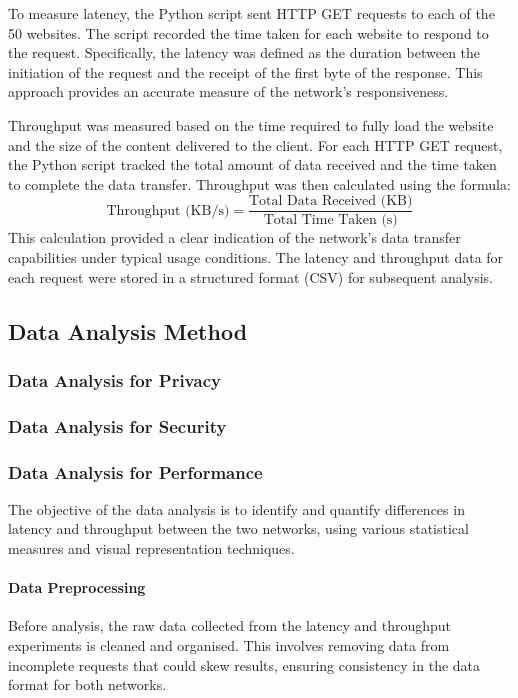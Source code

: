 \documentclass[12pt,conference]{IEEEtran}
\begin{document}
To measure latency, the Python script sent HTTP GET requests to each of the 50 websites. The script recorded the time taken for each website to respond to the request. Specifically, the latency was defined as the duration between the initiation of the request and the receipt of the first byte of the response. This approach provides an accurate measure of the network's responsiveness.

Throughput was measured based on the time required to fully load the website and the size of the content delivered to the client. For each HTTP GET request, the Python script tracked the total amount of data received and the time taken to complete the data transfer. Throughput was then calculated using the formula:
\[
\text{Throughput (KB/s)} = \frac{\text{Total Data Received (KB)}}{\text{Total Time Taken (s)}}
\]
This calculation provided a clear indication of the network's data transfer capabilities under typical usage conditions. The latency and throughput data for each request were stored in a structured format (CSV) for subsequent analysis.

\subsection{Data Analysis Method}
\subsubsection{Data Analysis for Privacy}
\subsubsection{Data Analysis for Security}
\subsubsection{Data Analysis for Performance}
The objective of the data analysis is to identify and quantify differences in latency and throughput between the two networks, using various statistical measures and visual representation techniques.
\paragraph{Data Preprocessing} Before analysis, the raw data collected from the latency and throughput experiments is cleaned and organised. This involves removing data from incomplete requests that could skew results, ensuring consistency in the data format for both networks.
\end{document}
